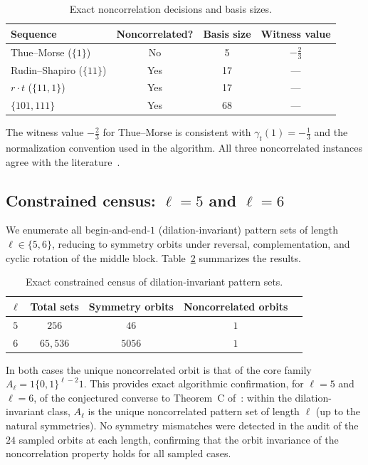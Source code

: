 \documentclass[11pt]{article}
\theoremstyle{definition}
\begin{document}
\begin{table}[ht]
\centering
\caption{Exact noncorrelation decisions and basis sizes.}
\label{tab:exact}
\begin{tabular}{lccc}
\toprule
Sequence & Noncorrelated? & Basis size & Witness value \\
\midrule
Thue--Morse ($\{1\}$)             & No  & 5  & $-\tfrac{2}{3}$ \\
Rudin--Shapiro ($\{11\}$)         & Yes & 17 & --- \\
$r \cdot t$ ($\{11,1\}$)          & Yes & 17 & --- \\
$\{101,111\}$                     & Yes & 68 & --- \\
\bottomrule
\end{tabular}
\end{table}

The witness value $-\tfrac{2}{3}$ for Thue--Morse is consistent with
$\gamma_t(1) = -\tfrac{1}{3}$ and the normalization convention used in
the algorithm. All three noncorrelated instances agree with the
literature~\cite{Kon21,ZPK18}.

\subsection{Constrained census: $\ell = 5$ and $\ell = 6$}
\label{subsec:census}

We enumerate all begin-and-end-$1$ (dilation-invariant) pattern sets
of length $\ell \in \{5, 6\}$, reducing to symmetry orbits under
reversal, complementation, and cyclic rotation of the middle block.
Table~\ref{tab:census} summarizes the results.

\begin{table}[ht]
\centering
\caption{Exact constrained census of dilation-invariant pattern sets.}
\label{tab:census}
\begin{tabular}{ccccc}
\toprule
$\ell$ & Total sets & Symmetry orbits & Noncorrelated orbits \\
\midrule
$5$ & $256$      & $46$   & $1$ \\
$6$ & $65{,}536$ & $5056$ & $1$ \\
\bottomrule
\end{tabular}
\end{table}

In both cases the unique noncorrelated orbit is that of the core
family $A_\ell = 1\{0,1\}^{\ell-2}1$. This provides exact algorithmic
confirmation, for $\ell = 5$ and $\ell = 6$, of the conjectured converse
to Theorem~C of~\cite{Kon21}: within the dilation-invariant class,
$A_\ell$ is the unique noncorrelated pattern set of length $\ell$
(up to the natural symmetries). No symmetry mismatches were detected
in the audit of the $24$ sampled orbits at each length, confirming that
the orbit invariance of the noncorrelation property holds for all
sampled cases.
\end{document}

